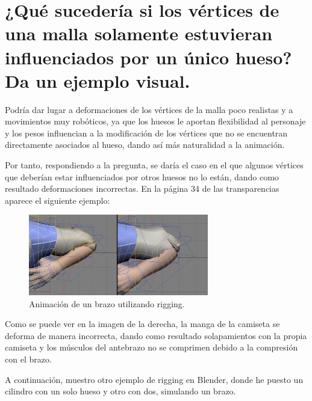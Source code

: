 \documentclass[]{article}
\begin{document}
\section{¿Qué sucedería si los vértices de una malla solamente estuvieran influenciados por un único hueso? Da un ejemplo visual.}

Podría dar lugar a deformaciones de los vértices de la malla poco realistas y a movimientos muy robóticos, ya que los huesos le aportan flexibilidad al personaje y los pesos influencian a la modificación de los vértices que no se encuentran directamente asociados al hueso, dando así más naturalidad a la animación.

\bigskip

Por tanto, respondiendo a la pregunta, se daría el caso en el que algunos vértices que deberían estar influenciados por otros huesos no lo están, dando como resultado deformaciones incorrectas. En la página 34 de las transparencias aparece el siguiente ejemplo:


\begin{figure}[H]
   \centering
   \includegraphics[width=0.7\textwidth]{imagenes/pag34.jpg}
   \caption{Animación de un brazo utilizando rigging\cite{diapos}.}
\end{figure}

Como se puede ver en la imagen de la derecha, la manga de la camiseta se deforma de manera incorrecta, dando como resultado solapamientos con la propia camiseta y los músculos del antebrazo no se comprimen debido a la compresión con el brazo.

\bigskip
\newpage

A continuación, muestro otro ejemplo de rigging en Blender, donde he puesto un cilindro con un solo hueso y otro con dos, simulando un brazo.
\end{document}
